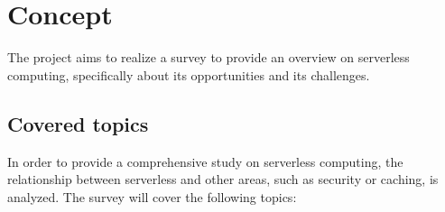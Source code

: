 \documentclass{scrartcl}
\begin{document}





\newpage
\section{Concept}\label{concept}

The project aims to realize a survey to provide an overview on serverless computing, specifically about its opportunities and its challenges.

\subsection{Covered topics}

In order to provide a comprehensive study on serverless computing, the relationship between serverless and other areas, such as security or caching, is analyzed. The survey will cover the following topics:
\end{document}
